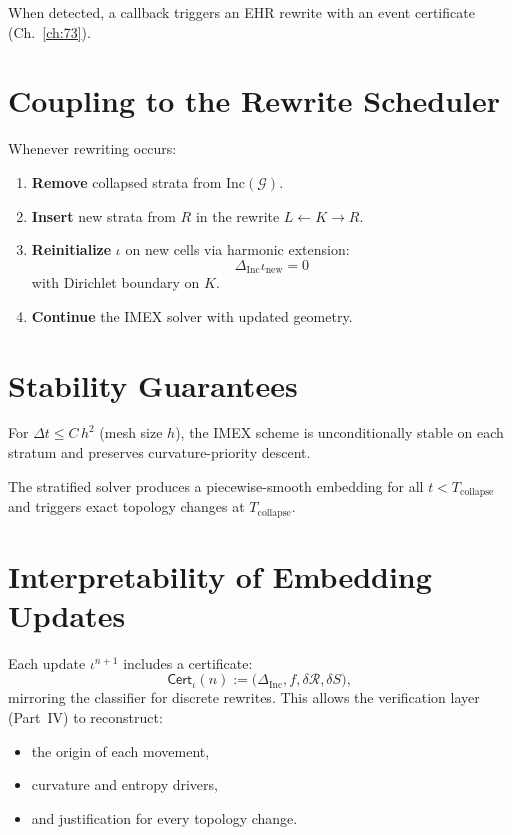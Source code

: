 When detected, a callback triggers an EHR rewrite with an event certificate (Ch.~\ref{ch:73}).

\section{Coupling to the Rewrite Scheduler}

Whenever rewriting occurs:
\begin{enumerate}
\item \textbf{Remove} collapsed strata from $\mathrm{Inc}(\mathcal{G})$.
\item \textbf{Insert} new strata from $R$ in the rewrite $L \leftarrow K \to R$.
\item \textbf{Reinitialize} $\iota$ on new cells via harmonic extension:
\[
 \Delta_{\mathrm{Inc}} \iota_{\text{new}} = 0
\]
with Dirichlet boundary on $K$.
\item \textbf{Continue} the IMEX solver with updated geometry.
\end{enumerate}

\section{Stability Guarantees}

\begin{theorem}
For $\Delta t \le C \, h^2$ (mesh size $h$),  
the IMEX scheme is unconditionally stable on each stratum  
and preserves curvature-priority descent.
\end{theorem}

\begin{theorem}
The stratified solver produces a piecewise-smooth embedding  
for all $t < T_{\mathrm{collapse}}$  
and triggers exact topology changes at $T_{\mathrm{collapse}}$.
\end{theorem}

\section{Interpretability of Embedding Updates}

Each update $\iota^{n+1}$ includes a certificate:
\[
  \mathsf{Cert}_{\iota}(n)
   := \bigl(\Delta_{\mathrm{Inc}}, f, \delta\mathcal{R}, \delta S \bigr),
\]
mirroring the classifier for discrete rewrites.
This allows the verification layer (Part~IV)
to reconstruct:
\begin{itemize}
\item the origin of each movement,
\item curvature and entropy drivers,
\item and justification for every topology change.
\end{itemize}

